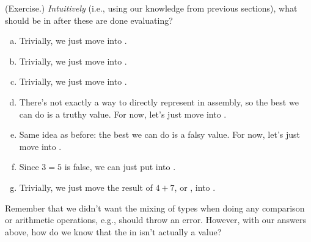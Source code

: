 \begin{mdframed}
    (Exercise.) \emph{Intuitively} (i.e., using our knowledge from previous sections), what should be in  after these are done evaluating? 

    \begin{enumerate}[a.]
        \item {}
        \begin{mdframed}
            Trivially, we just move  into .
        \end{mdframed}

        \item {}
        \begin{mdframed}
            Trivially, we just move  into .
        \end{mdframed}

        \item {}
        \begin{mdframed}
            Trivially, we just move  into .
        \end{mdframed}

        \item {}
        \begin{mdframed}
            There's not exactly a way to directly represent  in assembly, so the best we can do is a truthy value. For now, let's just move  into .
        \end{mdframed}

        \item {}
        \begin{mdframed}
            Same idea as before: the best we can do is a falsy value. For now, let's just move  into .
        \end{mdframed}

        \item {}
        \begin{mdframed}
            Since $3 = 5$ is false, we can just put  into .
        \end{mdframed}

        \item {}
        \begin{mdframed}
            Trivially, we just move the result of $4 + 7$, or , into .
        \end{mdframed}
    \end{enumerate}
\end{mdframed}
Remember that we didn't want the mixing of types when doing any comparison or arithmetic operations, e.g.,  should throw an error. However, with our answers above, how do we know that the  in  isn't actually a  value? 

